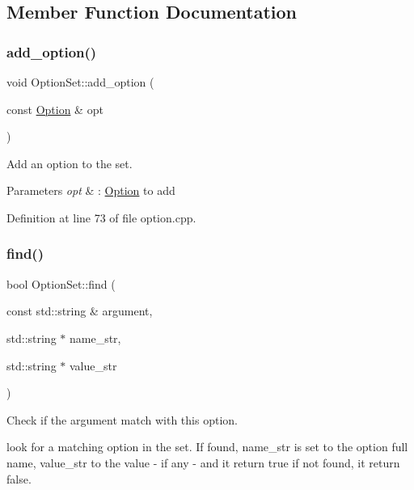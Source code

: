 \subsection{Member Function Documentation}
\hypertarget{class_option_set_a5a83cc35d74108a6302b893c616309ca}{}\label{class_option_set_a5a83cc35d74108a6302b893c616309ca} 
\subsubsection{\texorpdfstring{add\+\_\+option()}{add\_option()}}
{\footnotesize\ttfamily void Option\+Set\+::add\+\_\+option (\begin{DoxyParamCaption}\item[{const \hyperlink{class_option}{Option} \&}]{opt }\end{DoxyParamCaption})}



Add an option to the set. 


\begin{DoxyParams}{Parameters}
{\em opt} & \+: \hyperlink{class_option}{Option} to add \\
\hline
\end{DoxyParams}


Definition at line 73 of file option.\+cpp.

\hypertarget{class_option_set_a9355623ce41d8700f25f76476d0c8b2d}{}\label{class_option_set_a9355623ce41d8700f25f76476d0c8b2d} 
\subsubsection{\texorpdfstring{find()}{find()}}
{\footnotesize\ttfamily bool Option\+Set\+::find (\begin{DoxyParamCaption}\item[{const std\+::string \&}]{argument,  }\item[{std\+::string $\ast$}]{name\+\_\+str,  }\item[{std\+::string $\ast$}]{value\+\_\+str }\end{DoxyParamCaption})}



Check if the argument match with this option. 

look for a matching option in the set. If found, name\+\_\+str is set to the option full name, value\+\_\+str to the value -\/ if any -\/ and it return true if not found, it return false.


